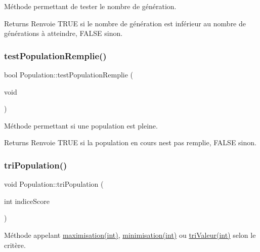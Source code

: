 Méthode permettant de tester le nombre de génération. 

\begin{DoxyReturn}{Returns}
Renvoie T\+R\+UE si le nombre de génération est inférieur au nombre de générations à atteindre, F\+A\+L\+SE sinon. 
\end{DoxyReturn}
\mbox{\label{class_population_a70cec52ba5d29e0f4a1a67a4ae52b276}} 
\subsubsection{\texorpdfstring{test\+Population\+Remplie()}{testPopulationRemplie()}}
{\footnotesize\ttfamily bool Population\+::test\+Population\+Remplie (\begin{DoxyParamCaption}\item[{void}]{ }\end{DoxyParamCaption})}



Méthode permettant si une population est pleine. 

\begin{DoxyReturn}{Returns}
Renvoie T\+R\+UE si la population en cours n\textquotesingle{}est pas remplie, F\+A\+L\+SE sinon. 
\end{DoxyReturn}
\mbox{\label{class_population_a15c4b45d033b6af3765f5e86ce43f232}} 
\subsubsection{\texorpdfstring{tri\+Population()}{triPopulation()}}
{\footnotesize\ttfamily void Population\+::tri\+Population (\begin{DoxyParamCaption}\item[{int}]{indice\+Score }\end{DoxyParamCaption})}



Méthode appelant \hyperlink{class_population_ae240b80ad4eae0f1b2ec5ec1edcd88c3}{maximisation(int)}, \hyperlink{class_population_a6f27e76b6b15668b343c43c56027515d}{minimisation(int)} ou \hyperlink{class_population_a4b167d07f145a1f1ea69b2bb4cfd2cfb}{tri\+Valeur(int)} selon le critère. 


